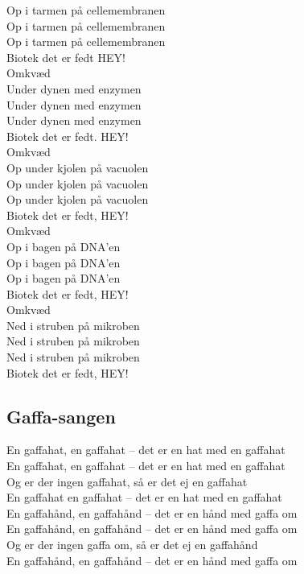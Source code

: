 Op i tarmen på cellemembranen\\
Op i tarmen på cellemembranen\\
Op i tarmen på cellemembranen\\
Biotek det er fedt HEY!\\

Omkvæd\\

Under dynen med enzymen\\
Under dynen med enzymen\\
Under dynen med enzymen\\
Biotek det er fedt. HEY!\\

Omkvæd\\

Op under kjolen på vacuolen\\
Op under kjolen på vacuolen\\
Op under kjolen på vacuolen\\
Biotek det er fedt, HEY!\\

Omkvæd\\

Op i bagen på DNA’en\\ 
Op i bagen på DNA’en\\
Op i bagen på DNA’en\\
Biotek det er fedt, HEY!\\

Omkvæd\\

Ned i struben på mikroben\\
Ned i struben på mikroben\\
Ned i struben på mikroben\\
Biotek det er fedt, HEY!\\

\subsection*{Gaffa-sangen}

En gaffahat, en gaffahat – det er en hat med en gaffahat\\
En gaffahat, en gaffahat – det er en hat med en gaffahat\\
Og er der ingen gaffahat, så er det ej en gaffahat\\
En gaffahat en gaffahat – det er en hat med en gaffahat\\

En gaffahånd, en gaffahånd – det er en hånd med gaffa om\\
En gaffahånd, en gaffahånd – det er en hånd med gaffa om\\
Og er der ingen gaffa om, så er det ej en gaffahånd\\
En gaffahånd, en gaffahånd – det er en hånd med gaffa om\\

